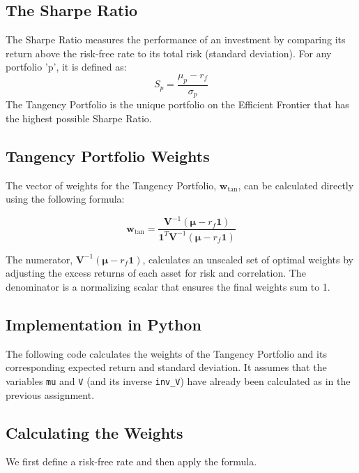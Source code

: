 \subsection*{The Sharpe Ratio}
    The Sharpe Ratio measures the performance of an investment by comparing its return above the risk-free rate to its total risk (standard deviation). For any portfolio 'p', it is defined as:
    \begin{equation}
        S_p = \frac{\mu_p - r_f}{\sigma_p}
    \end{equation}
    The Tangency Portfolio is the unique portfolio on the Efficient Frontier that has the highest possible Sharpe Ratio.

\subsection*{Tangency Portfolio Weights}
The vector of weights for the Tangency Portfolio, $\mathbf{w}_{\text{tan}}$, can be calculated directly using the following formula:

\begin{equation}
    \mathbf{w}_{\text{tan}} = \frac{\mathbf{V}^{-1}(\boldsymbol{\mu} - r_f\mathbf{1})}{\mathbf{1}^T\mathbf{V}^{-1}(\boldsymbol{\mu} - r_f\mathbf{1})}
\end{equation}

The numerator, $\mathbf{V}^{-1}(\boldsymbol{\mu} - r_f\mathbf{1})$, calculates an unscaled set of optimal weights by adjusting the excess returns of each asset for risk and correlation. The denominator is a normalizing scalar that ensures the final weights sum to 1.

\subsection*{Implementation in Python}

The following code calculates the weights of the Tangency Portfolio and its corresponding expected return and standard deviation. It assumes that the variables \texttt{mu} and \texttt{V} (and its inverse \texttt{inv\_V}) have already been calculated as in the previous assignment.

\subsection*{Calculating the Weights}
We first define a risk-free rate and then apply the formula.

